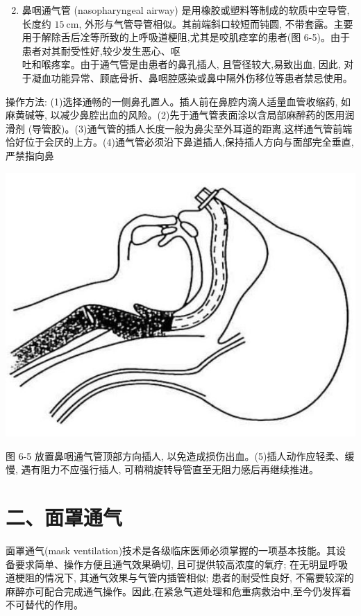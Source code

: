 \documentclass[10pt]{article}
\begin{document}
\begin{enumerate}
  \setcounter{enumi}{1}
  \item 鼻咽通气管 (nasopharyngeal airway) 是用橡胶或塑料等制成的软质中空导管,长度约 $15 \mathrm{~cm}$, 外形与气管导管相似。其前端斜口较短而钝圆, 不带套露。主要用于解除舌后㓌等所致的上呼吸道梗阻,尤其是咬肌痉挛的患者(图 6-5)。由于患者对其耐受性好,较少发生恶心、呕\\
吐和喉疼挛。由于通气管是由患者的鼻孔插人, 且管径较大,易致出血, 因此, 对于凝血功能异常、顾底骨折、鼻咽腔感染或鼻中隔外伤移位等患者禁忌使用。
\end{enumerate}

操作方法: (1)选择通畅的一侧鼻孔置人。插人前在鼻腔内滴人适量血管收缩药, 如麻黄碱等, 以减少鼻腔出血的风险。(2)先于通气管表面涂以含局部麻醉药的医用润滑剂 (导管胶)。(3)通气管的插人长度一般为鼻尖至外耳道的距离,这样通气管前端恰好位于会厌的上方。(4)通气管必须沿下鼻道插人,保持插人方向与面部完全垂直,严禁指向鼻

\begin{center}
\includegraphics[max width=\textwidth]{2024_07_09_002a177993bd97d1d6d7g-087}
\end{center}

图 6-5 放置鼻咽通气管顶部方向插人, 以免造成损伤出血。(5)插人动作应轻柔、缓慢, 遇有阻力不应强行插人, 可稍稍旋转导管直至无阻力感后再继续推进。

\section*{二、面罩通气}
面罩通气(mask ventilation)技术是各级临床医师必须掌握的一项基本技能。其设备要求简单、操作方便且通气效果确切, 且可提供较高浓度的氧疗; 在无明显呼吸道梗阻的情况下, 其通气效果与气管内插管相似; 患者的耐受性良好, 不需要较深的麻醉亦可配合完成通气操作。因此,在紧急气道处理和危重病救治中,至今仍发挥着不可替代的作用。
\end{document}
